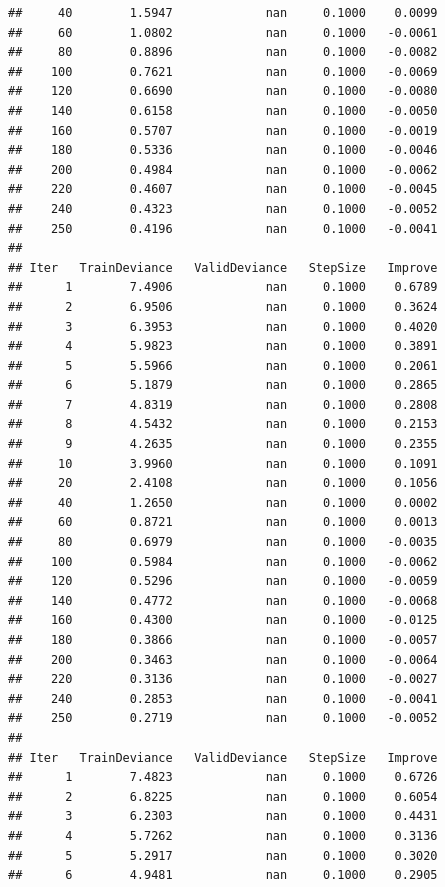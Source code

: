 \documentclass[
]{book}
\begin{document}
\begin{verbatim}
##     40        1.5947             nan     0.1000    0.0099
##     60        1.0802             nan     0.1000   -0.0061
##     80        0.8896             nan     0.1000   -0.0082
##    100        0.7621             nan     0.1000   -0.0069
##    120        0.6690             nan     0.1000   -0.0080
##    140        0.6158             nan     0.1000   -0.0050
##    160        0.5707             nan     0.1000   -0.0019
##    180        0.5336             nan     0.1000   -0.0046
##    200        0.4984             nan     0.1000   -0.0062
##    220        0.4607             nan     0.1000   -0.0045
##    240        0.4323             nan     0.1000   -0.0052
##    250        0.4196             nan     0.1000   -0.0041
## 
## Iter   TrainDeviance   ValidDeviance   StepSize   Improve
##      1        7.4906             nan     0.1000    0.6789
##      2        6.9506             nan     0.1000    0.3624
##      3        6.3953             nan     0.1000    0.4020
##      4        5.9823             nan     0.1000    0.3891
##      5        5.5966             nan     0.1000    0.2061
##      6        5.1879             nan     0.1000    0.2865
##      7        4.8319             nan     0.1000    0.2808
##      8        4.5432             nan     0.1000    0.2153
##      9        4.2635             nan     0.1000    0.2355
##     10        3.9960             nan     0.1000    0.1091
##     20        2.4108             nan     0.1000    0.1056
##     40        1.2650             nan     0.1000    0.0002
##     60        0.8721             nan     0.1000    0.0013
##     80        0.6979             nan     0.1000   -0.0035
##    100        0.5984             nan     0.1000   -0.0062
##    120        0.5296             nan     0.1000   -0.0059
##    140        0.4772             nan     0.1000   -0.0068
##    160        0.4300             nan     0.1000   -0.0125
##    180        0.3866             nan     0.1000   -0.0057
##    200        0.3463             nan     0.1000   -0.0064
##    220        0.3136             nan     0.1000   -0.0027
##    240        0.2853             nan     0.1000   -0.0041
##    250        0.2719             nan     0.1000   -0.0052
## 
## Iter   TrainDeviance   ValidDeviance   StepSize   Improve
##      1        7.4823             nan     0.1000    0.6726
##      2        6.8225             nan     0.1000    0.6054
##      3        6.2303             nan     0.1000    0.4431
##      4        5.7262             nan     0.1000    0.3136
##      5        5.2917             nan     0.1000    0.3020
##      6        4.9481             nan     0.1000    0.2905

\end{verbatim}
\end{document}
